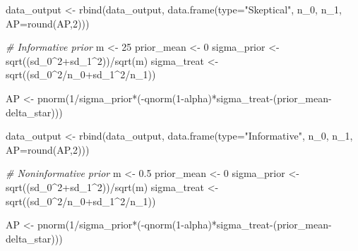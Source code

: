 \documentclass[
]{book}
\newenvironment{Shaded}{\begin{snugshade}}{\end{snugshade}}
\newcommand{\AttributeTok}[1]{\textcolor[rgb]{0.77,0.63,0.00}{#1}}
\newcommand{\CommentTok}[1]{\textcolor[rgb]{0.56,0.35,0.01}{\textit{#1}}}
\newcommand{\DecValTok}[1]{\textcolor[rgb]{0.00,0.00,0.81}{#1}}
\newcommand{\FloatTok}[1]{\textcolor[rgb]{0.00,0.00,0.81}{#1}}
\newcommand{\FunctionTok}[1]{\textcolor[rgb]{0.00,0.00,0.00}{#1}}
\newcommand{\NormalTok}[1]{#1}
\newcommand{\OtherTok}[1]{\textcolor[rgb]{0.56,0.35,0.01}{#1}}
\newcommand{\SpecialCharTok}[1]{\textcolor[rgb]{0.00,0.00,0.00}{#1}}
\newcommand{\StringTok}[1]{\textcolor[rgb]{0.31,0.60,0.02}{#1}}
\begin{document}
\begin{Shaded}
\begin{Highlighting}[]
\NormalTok{data\_output }\OtherTok{\textless{}{-}} \FunctionTok{rbind}\NormalTok{(data\_output, }\FunctionTok{data.frame}\NormalTok{(}\AttributeTok{type=}\StringTok{"Skeptical"}\NormalTok{, n\_0, n\_1, }\AttributeTok{AP=}\FunctionTok{round}\NormalTok{(AP,}\DecValTok{2}\NormalTok{)))}

\CommentTok{\# Informative prior}
\NormalTok{m }\OtherTok{\textless{}{-}} \DecValTok{25}
\NormalTok{prior\_mean }\OtherTok{\textless{}{-}} \DecValTok{0}
\NormalTok{sigma\_prior }\OtherTok{\textless{}{-}} \FunctionTok{sqrt}\NormalTok{((sd\_0}\SpecialCharTok{\^{}}\DecValTok{2}\SpecialCharTok{+}\NormalTok{sd\_1}\SpecialCharTok{\^{}}\DecValTok{2}\NormalTok{))}\SpecialCharTok{/}\FunctionTok{sqrt}\NormalTok{(m)}
\NormalTok{sigma\_treat }\OtherTok{\textless{}{-}} \FunctionTok{sqrt}\NormalTok{((sd\_0}\SpecialCharTok{\^{}}\DecValTok{2}\SpecialCharTok{/}\NormalTok{n\_0}\SpecialCharTok{+}\NormalTok{sd\_1}\SpecialCharTok{\^{}}\DecValTok{2}\SpecialCharTok{/}\NormalTok{n\_1))}

\NormalTok{AP }\OtherTok{\textless{}{-}} \FunctionTok{pnorm}\NormalTok{(}\DecValTok{1}\SpecialCharTok{/}\NormalTok{sigma\_prior}\SpecialCharTok{*}\NormalTok{(}\SpecialCharTok{{-}}\FunctionTok{qnorm}\NormalTok{(}\DecValTok{1}\SpecialCharTok{{-}}\NormalTok{alpha)}\SpecialCharTok{*}\NormalTok{sigma\_treat}\SpecialCharTok{{-}}\NormalTok{(prior\_mean}\SpecialCharTok{{-}}\NormalTok{delta\_star)))}

\NormalTok{data\_output }\OtherTok{\textless{}{-}} \FunctionTok{rbind}\NormalTok{(data\_output, }\FunctionTok{data.frame}\NormalTok{(}\AttributeTok{type=}\StringTok{"Informative"}\NormalTok{, n\_0, n\_1, }\AttributeTok{AP=}\FunctionTok{round}\NormalTok{(AP,}\DecValTok{2}\NormalTok{)))}

\CommentTok{\# Noninformative prior}
\NormalTok{m }\OtherTok{\textless{}{-}} \FloatTok{0.5}
\NormalTok{prior\_mean }\OtherTok{\textless{}{-}} \DecValTok{0}
\NormalTok{sigma\_prior }\OtherTok{\textless{}{-}} \FunctionTok{sqrt}\NormalTok{((sd\_0}\SpecialCharTok{\^{}}\DecValTok{2}\SpecialCharTok{+}\NormalTok{sd\_1}\SpecialCharTok{\^{}}\DecValTok{2}\NormalTok{))}\SpecialCharTok{/}\FunctionTok{sqrt}\NormalTok{(m)}
\NormalTok{sigma\_treat }\OtherTok{\textless{}{-}} \FunctionTok{sqrt}\NormalTok{((sd\_0}\SpecialCharTok{\^{}}\DecValTok{2}\SpecialCharTok{/}\NormalTok{n\_0}\SpecialCharTok{+}\NormalTok{sd\_1}\SpecialCharTok{\^{}}\DecValTok{2}\SpecialCharTok{/}\NormalTok{n\_1))}

\NormalTok{AP }\OtherTok{\textless{}{-}} \FunctionTok{pnorm}\NormalTok{(}\DecValTok{1}\SpecialCharTok{/}\NormalTok{sigma\_prior}\SpecialCharTok{*}\NormalTok{(}\SpecialCharTok{{-}}\FunctionTok{qnorm}\NormalTok{(}\DecValTok{1}\SpecialCharTok{{-}}\NormalTok{alpha)}\SpecialCharTok{*}\NormalTok{sigma\_treat}\SpecialCharTok{{-}}\NormalTok{(prior\_mean}\SpecialCharTok{{-}}\NormalTok{delta\_star)))}


\end{Highlighting}
\end{Shaded}
\end{document}
